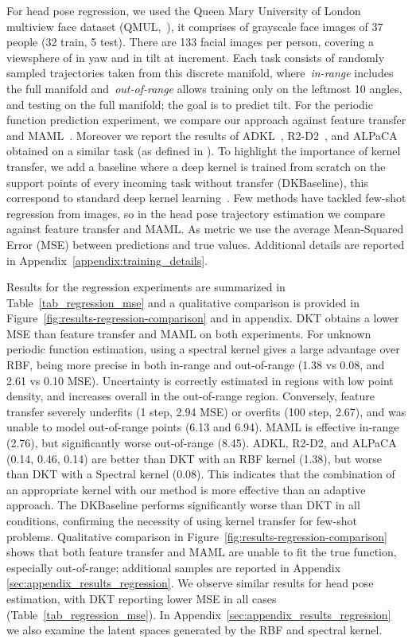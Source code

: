 \documentclass{article}
\begin{document}
For head pose regression, we used the Queen Mary University of London multiview face dataset (QMUL,~\citealp{gong1996investigation}), it comprises of grayscale face images of 37 people (32 train, 5 test). There are 133 facial images per person, covering a viewsphere of  in yaw and  in tilt at  increment. Each task consists of randomly sampled trajectories taken from this discrete manifold, where~\emph{in-range} includes the full manifold and~\emph{out-of-range} allows training only on the leftmost 10 angles, and testing on the full manifold; the goal is to predict tilt.
For the periodic function prediction experiment, we compare our approach against feature transfer and MAML~\citep{finn2017model}. Moreover we report the results of ADKL~\citep{tossou2019adaptive}, R2-D2~\citep{bertinetto2019meta}, and ALPaCA~\citep{harrison2018meta} obtained on a similar task (as defined in \citealp{yoon2018bayesian}). To highlight the importance of kernel transfer, we add a baseline where a deep kernel is trained from scratch on the support points of every incoming task without transfer (DKBaseline), this correspond to standard deep kernel learning~\citep{wilson2016deep}.
Few methods have tackled few-shot regression from images, so in the head pose trajectory estimation we compare against feature transfer and MAML. As metric we use the average Mean-Squared Error (MSE) between predictions and true values. Additional details are reported in Appendix~\ref{appendix:training_details}.

Results for the regression experiments are summarized in Table~\ref{tab_regression_mse} and a qualitative comparison is provided in Figure~\ref{fig:results-regression-comparison} and in appendix. DKT obtains a lower MSE than feature transfer and MAML on both experiments. For unknown periodic function estimation, using a spectral kernel gives a large advantage over RBF, being more precise in both in-range and out-of-range (1.38 vs 0.08, and 2.61 vs 0.10 MSE). Uncertainty is correctly estimated in regions with low point density, and increases overall in the out-of-range region. Conversely, feature transfer severely underfits (1 step, 2.94 MSE) or overfits (100 step, 2.67), and was unable to model out-of-range points (6.13 and 6.94). MAML is effective in-range (2.76), but significantly worse out-of-range (8.45). ADKL, R2-D2, and ALPaCA (0.14, 0.46, 0.14) are better than DKT with an RBF kernel (1.38), but worse than DKT with a Spectral kernel (0.08). This indicates that the combination of an appropriate kernel with our method is more effective than an adaptive approach. The DKBaseline performs significantly worse than DKT in all conditions, confirming the necessity of using kernel transfer for few-shot problems.
Qualitative comparison in Figure~\ref{fig:results-regression-comparison} shows that both feature transfer and MAML are unable to fit the true function, especially out-of-range; additional samples are reported in Appendix \ref{sec:appendix_results_regression}. We observe similar results for head pose estimation, with DKT reporting lower MSE in all cases (Table~\ref{tab_regression_mse}). 
In Appendix~\ref{sec:appendix_results_regression} we also examine the latent spaces generated by the RBF and spectral kernel.
\end{document}
